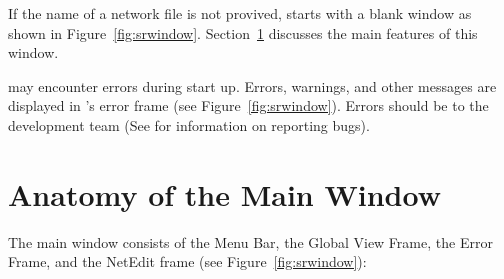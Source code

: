 If the name of a network file is not provived, \sr{} starts with
a blank window as shown in Figure~\ref{fig:srwindow}.
Section~\ref{sec:windowanatomy} discusses the main features of this
window.

\sr{} may encounter errors during start up.  Errors, warnings, and
other messages are displayed in
\sr{}'s error frame (see Figure~\ref{fig:srwindow}).   Errors
should be  to the \sr{} development
team (See  for information on
reporting bugs).

\section{Anatomy of the Main Window}
\label{sec:windowanatomy}

The \sr{} main window consists of the Menu Bar, the Global View Frame,
the Error Frame, and the NetEdit frame (see
Figure~\ref{fig:srwindow}):

